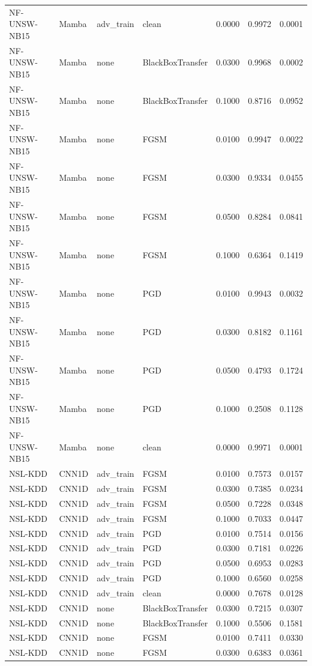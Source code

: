 \begin{table}[ht]
\begin{tabular}{llllrrr}
NF-UNSW-NB15 & Mamba & adv\_train & clean & 0.0000 & 0.9972 & 0.0001 \\
NF-UNSW-NB15 & Mamba & none & BlackBoxTransfer & 0.0300 & 0.9968 & 0.0002 \\
NF-UNSW-NB15 & Mamba & none & BlackBoxTransfer & 0.1000 & 0.8716 & 0.0952 \\
NF-UNSW-NB15 & Mamba & none & FGSM & 0.0100 & 0.9947 & 0.0022 \\
NF-UNSW-NB15 & Mamba & none & FGSM & 0.0300 & 0.9334 & 0.0455 \\
NF-UNSW-NB15 & Mamba & none & FGSM & 0.0500 & 0.8284 & 0.0841 \\
NF-UNSW-NB15 & Mamba & none & FGSM & 0.1000 & 0.6364 & 0.1419 \\
NF-UNSW-NB15 & Mamba & none & PGD & 0.0100 & 0.9943 & 0.0032 \\
NF-UNSW-NB15 & Mamba & none & PGD & 0.0300 & 0.8182 & 0.1161 \\
NF-UNSW-NB15 & Mamba & none & PGD & 0.0500 & 0.4793 & 0.1724 \\
NF-UNSW-NB15 & Mamba & none & PGD & 0.1000 & 0.2508 & 0.1128 \\
NF-UNSW-NB15 & Mamba & none & clean & 0.0000 & 0.9971 & 0.0001 \\
NSL-KDD & CNN1D & adv\_train & FGSM & 0.0100 & 0.7573 & 0.0157 \\
NSL-KDD & CNN1D & adv\_train & FGSM & 0.0300 & 0.7385 & 0.0234 \\
NSL-KDD & CNN1D & adv\_train & FGSM & 0.0500 & 0.7228 & 0.0348 \\
NSL-KDD & CNN1D & adv\_train & FGSM & 0.1000 & 0.7033 & 0.0447 \\
NSL-KDD & CNN1D & adv\_train & PGD & 0.0100 & 0.7514 & 0.0156 \\
NSL-KDD & CNN1D & adv\_train & PGD & 0.0300 & 0.7181 & 0.0226 \\
NSL-KDD & CNN1D & adv\_train & PGD & 0.0500 & 0.6953 & 0.0283 \\
NSL-KDD & CNN1D & adv\_train & PGD & 0.1000 & 0.6560 & 0.0258 \\
NSL-KDD & CNN1D & adv\_train & clean & 0.0000 & 0.7678 & 0.0128 \\
NSL-KDD & CNN1D & none & BlackBoxTransfer & 0.0300 & 0.7215 & 0.0307 \\
NSL-KDD & CNN1D & none & BlackBoxTransfer & 0.1000 & 0.5506 & 0.1581 \\
NSL-KDD & CNN1D & none & FGSM & 0.0100 & 0.7411 & 0.0330 \\
NSL-KDD & CNN1D & none & FGSM & 0.0300 & 0.6383 & 0.0361 \\

\end{tabular}
\end{table}
